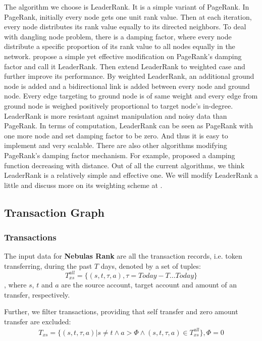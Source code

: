 The algorithm we choose is LeaderRank\cite{Chen2013}\cite{Li2014}. It is a simple variant of PageRank\cite{Brin2010}\cite{page1999pagerank}. In PageRank, initially every node gets one unit rank value. Then at each iteration, every node distributes its rank value equally to its directed neighbors. To deal with dangling node problem, there is a damping factor, where every node distribute a specific proportion of its rank value to all nodes equally in the network. \textcite{Chen2013} propose a simple yet effective modification on PageRank's damping factor and call it LeaderRank. Then \textcite{Li2014} extend LeaderRank to weighted case and further improve its performance. By weighted LeaderRank\cite{Li2014}, an additional ground node is added and a bidirectional link is added between every node and ground node. Every edge targeting to ground node is of same weight and every edge from ground node is weighed positively proportional to target node's in-degree. LeaderRank is more resistant against manipulation and noisy data than PageRank\cite{Chen2013}\cite{Li2014}\cite{Lu2016}. In terms of computation, LeaderRank can be seen as PageRank with one more node and set damping factor to be zero. And thus it is easy to implement and very scalable. There are also other algorithms modifying PageRank's damping factor mechanism. For example, \textcite{Baeza-Yates2006} proposed a damping function decreasing with distance. Out of all the current algorithms, we think LeaderRank is a relatively simple and effective one. We will modify LeaderRank a little and discuss more on its weighting scheme at .

\subsection{Transaction Graph} \label{sec:txg}

\subsubsection{Transactions}\label{subsec:transfer}
The input data for \textbf{Nebulas Rank} are all the transaction records, i.e. token transferring, during the past $T$ days, denoted by a set of tuples:
$$
	T_{xs}^{all} = \{(s,t,\tau, a), \tau = Today-T \dots Today \}
$$
, where $s$, $t$ and $a$ are the source account, target account and amount of an transfer, respectively.

Further, we filter transactions, providing that self transfer and zero amount transfer are excluded:
\begin{align}
	T_{xs} = \{(s,t,\tau, a)| s \neq t \land a > \Phi \land (s,t,\tau, a) \in T_{xs}^{all} \}, \Phi = 0
\end{align}

